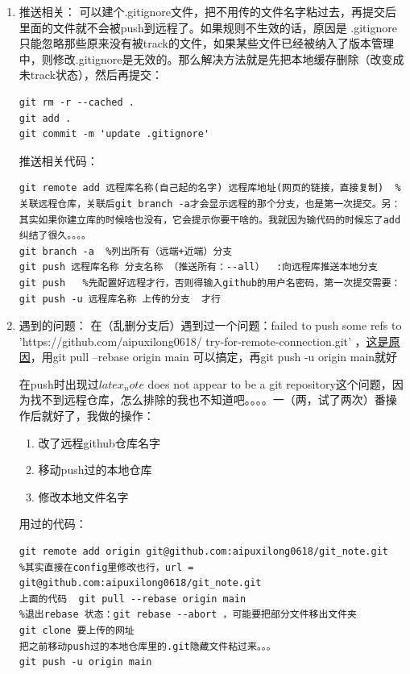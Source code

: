 \documentclass{article}
\begin{document}
\begin{enumerate}
\item 推送相关：
可以建个.gitignore文件，把不用传的文件名字粘过去，再提交后里面的文件就不会被push到远程了。如果规则不生效的话，原因是 .gitignore 只能忽略那些原来没有被track的文件，如果某些文件已经被纳入了版本管理中，则修改.gitignore是无效的。那么解决方法就是先把本地缓存删除（改变成未track状态），然后再提交：
\begin{lstlisting}
git rm -r --cached .	
git add .	
git commit -m 'update .gitignore'
\end{lstlisting}
推送相关代码：
\begin{lstlisting}[breaklines=true]
git remote add 远程库名称(自己起的名字) 远程库地址(网页的链接，直接复制)  %关联远程仓库，关联后git branch -a才会显示远程的那个分支，也是第一次提交。另：其实如果你建立库的时候啥也没有，它会提示你要干啥的。我就因为输代码的时候忘了add纠结了很久。。。。
git branch -a  %列出所有（远端+近端）分支
git push 远程库名称 分支名称 （推送所有：--all）  :向远程库推送本地分支
git push   %先配置好远程才行，否则得输入github的用户名密码，第一次提交需要： git push -u 远程库名称 上传的分支  才行
\end{lstlisting}

\item 遇到的问题：
在（乱删分支后）遇到过一个问题：failed to push some refs to 'https://github.com/aipuxilong0618/
try-for-remote-connection.git' ，\href{https://www.cnblogs.com/Rainingday/p/12364690.html}{这是原因}，用git pull --rebase origin main
可以搞定，再git push -u origin main就好

在push时出现过$latex_note$ does not appear to be a git repository这个问题，因为找不到远程仓库，怎么排除的我也不知道吧。。。。一（两，试了两次）番操作后就好了，我做的操作：
\begin{enumerate}
	\item 改了远程github仓库名字
	\item 移动push过的本地仓库
	\item 修改本地文件名字
\end{enumerate}

用过的代码：
\begin{lstlisting}
git remote add origin git@github.com:aipuxilong0618/git_note.git  
%其实直接在config里修改也行，url = git@github.com:aipuxilong0618/git_note.git
上面的代码  git pull --rebase origin main
%退出rebase 状态：git rebase --abort ，可能要把部分文件移出文件夹
git clone 要上传的网址
把之前移动push过的本地仓库里的.git隐藏文件粘过来。。。
git push -u origin main
\end{lstlisting}

\end{enumerate}
\end{document}
